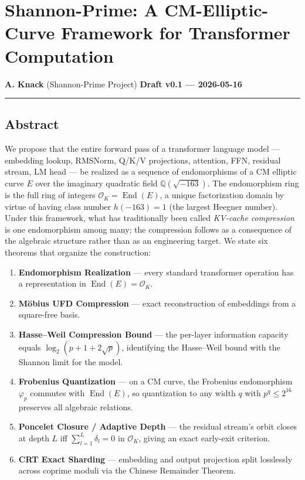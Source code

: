 \documentclass[
  11pt,
]{article}
\author{}
\date{}
\providecommand{\tightlist}{%
  \setlength{\itemsep}{0pt}\setlength{\parskip}{0pt}}
\begin{document}
\hypertarget{shannon-prime-a-cm-elliptic-curve-framework-for-transformer-computation}{%
\section{Shannon-Prime: A CM-Elliptic-Curve Framework for Transformer
Computation}\label{shannon-prime-a-cm-elliptic-curve-framework-for-transformer-computation}}

\textbf{A. Knack} (Shannon-Prime Project) \textbf{Draft v0.1 ---
2026-05-16}

\begin{center}\rule{0.5\linewidth}{0.5pt}\end{center}

\hypertarget{abstract}{%
\subsection{Abstract}\label{abstract}}

We propose that the entire forward pass of a transformer language model
--- embedding lookup, RMSNorm, Q/K/V projections, attention, FFN,
residual stream, LM head --- be realized as a sequence of endomorphisms
of a CM elliptic curve \(E\) over the imaginary quadratic field
\(\mathbb{Q}(\sqrt{-163})\). The endomorphism ring is the full ring of
integers \(\mathcal{O}_K = \operatorname{End}(E)\), a unique
factorization domain by virtue of having class number \(h(-163) = 1\)
(the largest Heegner number). Under this framework, what has
traditionally been called \emph{KV-cache compression} is one
endomorphism among many; the compression follows as a consequence of the
algebraic structure rather than as an engineering target. We state six
theorems that organize the construction:

\begin{enumerate}
\def\labelenumi{\arabic{enumi}.}
\tightlist
\item
  \textbf{Endomorphism Realization} --- every standard transformer
  operation has a representation in
  \(\operatorname{End}(E) = \mathcal{O}_K\).
\item
  \textbf{Möbius UFD Compression} --- exact reconstruction of embeddings
  from a square-free basis.
\item
  \textbf{Hasse--Weil Compression Bound} --- the per-layer information
  capacity equals \(\log_2(p + 1 + 2\sqrt{p})\), identifying the
  Hasse--Weil bound with the Shannon limit for the model.
\item
  \textbf{Frobenius Quantization} --- on a CM curve, the Frobenius
  endomorphism \(\varphi_p\) commutes with \(\operatorname{End}(E)\), so
  quantization to any width \(q\) with \(p^q \leq 2^{16}\) preserves all
  algebraic relations.
\item
  \textbf{Poncelet Closure / Adaptive Depth} --- the residual stream's
  orbit closes at depth \(L\) iff \(\sum_{l=1}^L \delta_l = 0\) in
  \(\mathcal{O}_K\), giving an exact early-exit criterion.
\item
  \textbf{CRT Exact Sharding} --- embedding and output projection split
  losslessly across coprime moduli via the Chinese Remainder Theorem.
\end{enumerate}
\end{document}
